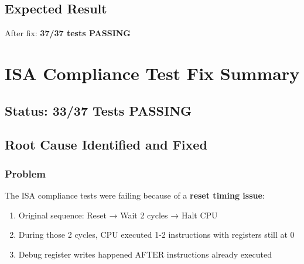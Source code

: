 \subsection{Expected Result}\label{cr:fix:rtl-isa-test-fix:expected-result}

\begin{record}

After fix: \textbf{37/37 tests PASSING} \ok{}

\end{record}

\section{ISA Compliance Test Fix Summary}\label{cr:fix:test-fix-summary}

\subsection{\texorpdfstring{Status: 33/37 Tests PASSING
\ok{}}{Status: 33/37 Tests PASSING }}\label{cr:fix:test-fix-summary:status-3337-tests-passing-white-check-mark}

\subsection{Root Cause Identified and Fixed}\label{cr:fix:test-fix-summary:root-cause-identified-and-fixed}

\subsubsection{Problem}\label{cr:fix:test-fix-summary:problem}

\begin{record}

The ISA compliance tests were failing because of a \textbf{reset timing
issue}:

\begin{enumerate}
\def\labelenumi{\arabic{enumi}.}
\tightlist
\item
  Original sequence: Reset → Wait 2 cycles → Halt CPU
\item
  During those 2 cycles, CPU executed 1-2 instructions with registers
  still at 0
\item
  Debug register writes happened AFTER instructions already executed
\end{enumerate}

\end{record}

